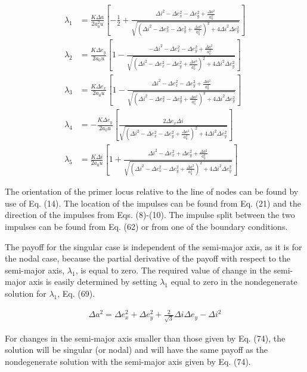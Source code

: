 \documentclass[12pt]{article}
\begin{document}
\begin{align}
\lambda_1 &= \frac{K \Delta a}{2a_0^2 u} \left[- \frac{1}{2} + \frac{\Delta i^2 - \Delta e_x^2 - \Delta e_y^2 + \frac{\Delta a^2}{a_0^2}}{\sqrt{\left( \Delta i^2 - \Delta e_x^2 - \Delta e_y^2 + \frac{\Delta a^2}{a_0^2} \right)^2 + 4 \Delta i^2 \Delta e_y^2}} \right] \tag{69} \\
\lambda_2 &= \frac{K \Delta e_y}{2 a_0 u} \left[ 1 - \frac{-\Delta i^2 - \Delta e_x^2 - \Delta e_y^2 + \frac{\Delta a^2}{a_0^2}}{\sqrt{(\Delta i^2 - \Delta e_x^2 - \Delta e_y^2 + \frac{\Delta a^2}{a_0^2})^2 + 4 \Delta i^2 \Delta e_y^2}} \right] \tag{70} \\
\lambda_3 &= \frac{K \Delta e_x}{2 a_0 u} \left[ 1 - \frac{\Delta i^2 - \Delta e_x^2 - \Delta e_y^2 + \frac{\Delta a^2}{a_0^2}}{\sqrt{(\Delta i^2 - \Delta e_x^2 - \Delta e_y^2 + \frac{\Delta a^2}{a_0^2})^2 + 4 \Delta i^2 \Delta e_y^2}} \right] \tag{71} \\
\lambda_4 &= -\frac{K \Delta e_y}{2 a_0 u} \left[ \frac{2 \Delta e_x \Delta i}{\sqrt{(\Delta i^2 - \Delta e_x^2 - \Delta e_y^2 + \frac{\Delta a^2}{a_0^2})^2 + 4 \Delta i^2 \Delta e_y^2}} \right] \tag{72} \\
\lambda_5 &= \frac{K \Delta i}{2 a_0 u} \left[ 1 + \frac{\Delta i^2 - \Delta e_x^2 + \Delta e_y^2 + \frac{\Delta a^2}{a_0^2}}{\sqrt{(\Delta i^2 - \Delta e_x^2 - \Delta e_y^2 + \frac{\Delta a^2}{a_0^2})^2 + 4 \Delta i^2 \Delta e_y^2}} \right] \tag{73}
\end{align}

The orientation of the primer locus relative to the line of nodes can be found by use of Eq. (14). The location of the impulses can be found from Eq. (21) and the direction of the impulses from Eqs. (8)-(10). The impulse split between the two impulses can be found from Eq. (62) or from one of the boundary conditions.

The payoff for the singular case is independent of the semi-major axis, as it is for the nodal case, because the partial derivative of the payoff with respect to the semi-major axis, $\lambda_1$, is equal to zero. The required value of change in the semi-major axis is easily determined by setting $\lambda_1$ equal to zero in the nondegenerate solution for $\lambda_1$, Eq. (69).

\begin{align}
\Delta a^2 = \Delta e_x^2 + \Delta e_y^2 + \frac{2}{\sqrt{3}} \Delta i \Delta e_y - \Delta i^2 \tag{74}
\end{align}

For changes in the semi-major axis smaller than those given by Eq. (74), the solution will be singular (or nodal) and will have the same payoff as the nondegenerate solution with the semi-major axis given by Eq. (74).
\end{document}
